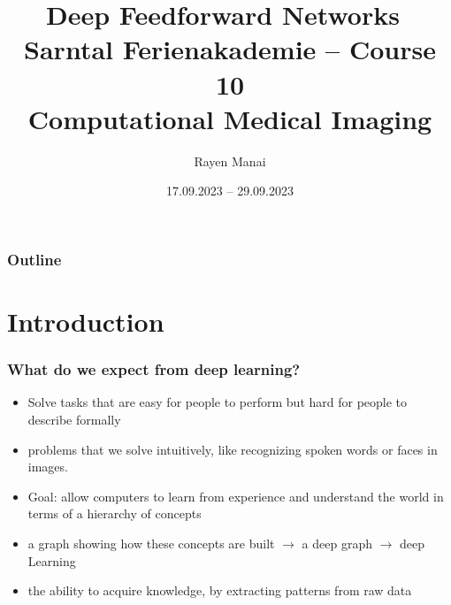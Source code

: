 \documentclass{beamer}
\title[Backpropagation and training neural networks]{
	\Large Deep Feedforward Networks~\cite{Goodfellow-et-al-2016} \\
	[5mm] \normalsize Sarntal Ferienakademie -- Course 10 \\
	Computational Medical Imaging
}
\author{Rayen Manai}
\institute[]{
    TU München\\
}
\date{17.09.2023 -- 29.09.2023}
\begin{document}
\begin{frame}
	\titlepage
\end{frame}

\begin{frame}
	\frametitle{Outline}
	\tableofcontents
\end{frame}

\section{Introduction}
\begin{frame}
 \frametitle{What do we expect from deep learning?}
	\begin{itemize}
		\item Solve tasks that are easy for people to perform but hard for people to describe formally 
		\item problems that we solve intuitively, like recognizing spoken words or faces in images.
		\item Goal: allow computers to learn from experience and understand the world in terms of a hierarchy of concepts
		\item a graph showing how these concepts are built $\rightarrow$ a deep graph $\rightarrow$ deep Learning
		\item the ability to acquire knowledge, by extracting patterns from raw data
	\end{itemize}

\end{frame}
\end{document}

